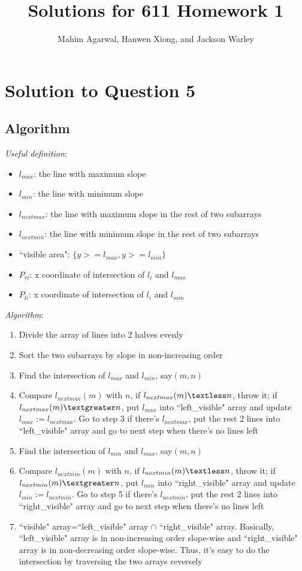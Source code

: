\documentclass[11pt]{article}
\title{Solutions for 611 Homework 1}
\author{Mahim Agarwal, Hanwen Xiong, and Jackson Warley}
\begin{document}
\maketitle

\section{Solution to Question 5}

\subsection{Algorithm}
\emph{Useful definition}:
\begin{itemize}
	\item $l_{max}$: the line with maximum slope
	\item $l_{min}$: the line with minimum slope
	\item $l_{nextmax}$: the line with maximum slope in the rest of two subarrays
	\item $l_{nextmin}$: the line with minimum slope in the rest of two subarrays
	\item ``visible area": $\{y>=l_{max}, y>=l_{min}\}$
	\item $P_{ri}$: x coordinate of intersection of $l_{i}$ and $l_{max}$
	\item $P_{li}$: x coordinate of intersection of $l_{i}$ and $l_{min}$
\end{itemize}
\emph{Algorithm}:
\begin{enumerate}
	\item Divide the array of lines into 2 halves evenly
	\item Sort the two subarrays by slope in non-increasing order
	\item Find the intersection of $l_{max}$ and $l_{min}$, say$(m, n)$
	\item Compare $l_{nextmax}(m)$ with $n$,  if $l_{nextmax}(m) \textless n$, throw it; if $l_{nextmax}(m) \textgreater n$, put $l_{max}$ into ``left\_visible" array and update $l_{max} := l_{nextmax}$. Go to step 3 if there's $l_{nextmax}$, put the rest 2 lines into ``left\_visible" array and go to next step when there's no lines left
	\item Find the intersection of $l_{min}$ and $l_{max}$, say$(m, n)$
	\item Compare $l_{nextmin}(m)$ with $n$,  if $l_{nextmin}(m) \textless n$, throw it; if $l_{nextmin}(m) \textgreater n$, put $l_{min}$ into ``right\_visible" array and update $l_{min} := l_{nextmin}$. Go to step 5 if there's $l_{nextmin}$, put the rest 2 lines into ``right\_visible" array and go to next step when there's no lines left
	\item ``visible" array=``left\_visible" array $\cap$ ``right\_visible" array. Basically, ``left\_visible" array is in non-increasing order slope-wise and ``right\_visible" array is in non-decreasing order slope-wise. Thus, it's easy to do the intersection by traversing the two arrays reversely
\end{enumerate}
\end{document}
